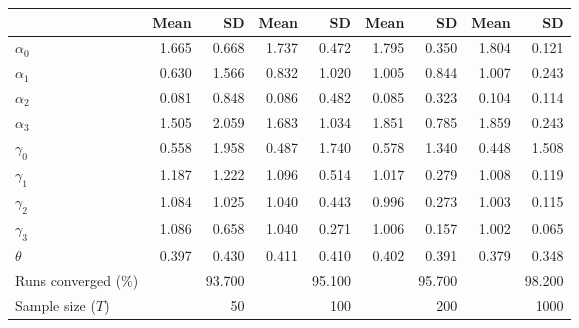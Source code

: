 
\begin{tabular}[t]{lrrrrrrrr}
\toprule
  & Mean & SD & Mean  & SD  & Mean   & SD   & Mean    & SD   \\
\midrule
$\alpha_{0}$ & 1.665 & 0.668 & 1.737 & 0.472 & 1.795 & 0.350 & 1.804 & 0.121\\
$\alpha_{1}$ & 0.630 & 1.566 & 0.832 & 1.020 & 1.005 & 0.844 & 1.007 & 0.243\\
$\alpha_{2}$ & 0.081 & 0.848 & 0.086 & 0.482 & 0.085 & 0.323 & 0.104 & 0.114\\
$\alpha_{3}$ & 1.505 & 2.059 & 1.683 & 1.034 & 1.851 & 0.785 & 1.859 & 0.243\\
$\gamma_{0}$ & 0.558 & 1.958 & 0.487 & 1.740 & 0.578 & 1.340 & 0.448 & 1.508\\
$\gamma_{1}$ & 1.187 & 1.222 & 1.096 & 0.514 & 1.017 & 0.279 & 1.008 & 0.119\\
$\gamma_{2}$ & 1.084 & 1.025 & 1.040 & 0.443 & 0.996 & 0.273 & 1.003 & 0.115\\
$\gamma_{3}$ & 1.086 & 0.658 & 1.040 & 0.271 & 1.006 & 0.157 & 1.002 & 0.065\\
$\theta$ & 0.397 & 0.430 & 0.411 & 0.410 & 0.402 & 0.391 & 0.379 & 0.348\\
Runs converged (\%) &  & 93.700 &  & 95.100 &  & 95.700 &  & 98.200\\
Sample size ($T$) &  & 50 &  & 100 &  & 200 &  & 1000\\
\bottomrule
\end{tabular}
